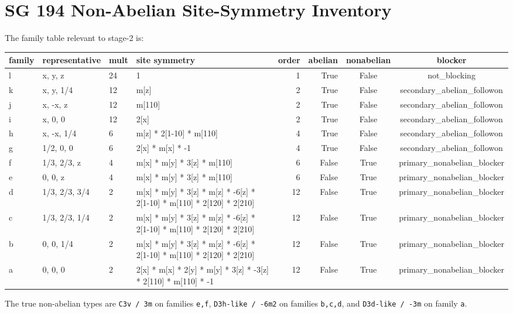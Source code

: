 \documentclass[11pt]{article}
\begin{document}
\section{SG 194 Non-Abelian Site-Symmetry Inventory}
The family table relevant to stage-2 is:
\begin{center}
\begin{longtable}{llllrrcc}
\toprule
family & representative & mult & site symmetry & order & abelian & nonabelian & blocker \\
\midrule
\endhead
l & x, y, z & 24 & 1 & 1 & True & False & not\_blocking \\
k & x, y, 1/4 & 12 & m[z] & 2 & True & False & secondary\_abelian\_followon \\
j & x, -x, z & 12 & m[110] & 2 & True & False & secondary\_abelian\_followon \\
i & x, 0, 0 & 12 & 2[x] & 2 & True & False & secondary\_abelian\_followon \\
h & x, -x, 1/4 & 6 & m[z] * 2[1-10] * m[110] & 4 & True & False & secondary\_abelian\_followon \\
g & 1/2, 0, 0 & 6 & 2[x] * m[x] * -1 & 4 & True & False & secondary\_abelian\_followon \\
f & 1/3, 2/3, z & 4 & m[x] * m[y] * 3[z] * m[110] & 6 & False & True & primary\_nonabelian\_blocker \\
e & 0, 0, z & 4 & m[x] * m[y] * 3[z] * m[110] & 6 & False & True & primary\_nonabelian\_blocker \\
d & 1/3, 2/3, 3/4 & 2 & m[x] * m[y] * 3[z] * m[z] * -6[z] * 2[1-10] * m[110] * 2[120] * 2[210] & 12 & False & True & primary\_nonabelian\_blocker \\
c & 1/3, 2/3, 1/4 & 2 & m[x] * m[y] * 3[z] * m[z] * -6[z] * 2[1-10] * m[110] * 2[120] * 2[210] & 12 & False & True & primary\_nonabelian\_blocker \\
b & 0, 0, 1/4 & 2 & m[x] * m[y] * 3[z] * m[z] * -6[z] * 2[1-10] * m[110] * 2[120] * 2[210] & 12 & False & True & primary\_nonabelian\_blocker \\
a & 0, 0, 0 & 2 & 2[x] * m[x] * 2[y] * m[y] * 3[z] * -3[z] * 2[110] * m[110] * -1 & 12 & False & True & primary\_nonabelian\_blocker \\
\bottomrule
\end{longtable}
\end{center}
The true non-abelian types are \texttt{C3v / 3m} on families \texttt{e,f}, \texttt{D3h-like / -6m2} on families \texttt{b,c,d}, and \texttt{D3d-like / -3m} on family \texttt{a}.
\end{document}
